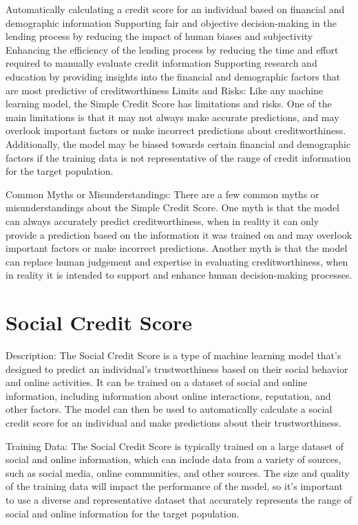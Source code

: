 Automatically calculating a credit score for an individual based on financial and demographic information
Supporting fair and objective decision-making in the lending process by reducing the impact of human biases and subjectivity
Enhancing the efficiency of the lending process by reducing the time and effort required to manually evaluate credit information
Supporting research and education by providing insights into the financial and demographic factors that are most predictive of creditworthiness
Limits and Risks:
Like any machine learning model, the Simple Credit Score has limitations and risks. One of the main limitations is that it may not always make accurate predictions, and may overlook important factors or make incorrect predictions about creditworthiness. Additionally, the model may be biased towards certain financial and demographic factors if the training data is not representative of the range of credit information for the target population.

Common Myths or Misunderstandings:
There are a few common myths or misunderstandings about the Simple Credit Score. One myth is that the model can always accurately predict creditworthiness, when in reality it can only provide a prediction based on the information it was trained on and may overlook important factors or make incorrect predictions. Another myth is that the model can replace human judgement and expertise in evaluating creditworthiness, when in reality it is intended to support and enhance human decision-making processes.

\section{Social Credit Score}

Description:
The Social Credit Score is a type of machine learning model that's designed to predict an individual's trustworthiness based on their social behavior and online activities. It can be trained on a dataset of social and online information, including information about online interactions, reputation, and other factors. The model can then be used to automatically calculate a social credit score for an individual and make predictions about their trustworthiness.

Training Data:
The Social Credit Score is typically trained on a large dataset of social and online information, which can include data from a variety of sources, such as social media, online communities, and other sources. The size and quality of the training data will impact the performance of the model, so it's important to use a diverse and representative dataset that accurately represents the range of social and online information for the target population.

